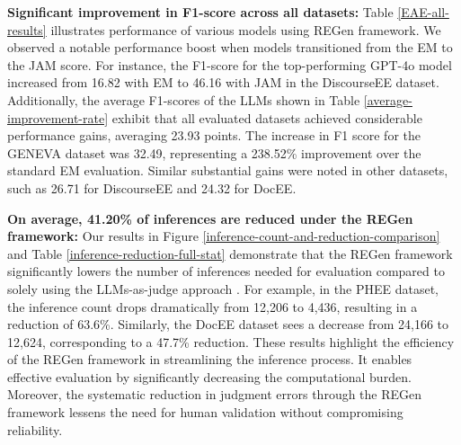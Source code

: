 \begin{table*}[h!]
\begin{tabular}{l|cccc|cccc|cccc}
\bottomrule
\end{tabular}

\caption{Evaluation results using the REGen framework for event argument extraction across the six datasets. The table reports F1-scores for models assessed at different evaluation levels: Exact Match (EM), Relaxed Match (RM), Complex Match (CM), and Judgment-Aligned Match (JAM). Due to space constraints, detailed precision, recall, and F1-scores are provided in Appendix Tables \ref{DiscourseEE-all-results}-\ref{WikiEvents-all-results}. The highest and the second-highest values in a column are highlighted using a dark shade and light shade, respectively.}
\label{EAE-all-results}
\end{table*}

\textbf{Significant improvement in F1-score across all datasets:} Table \ref{EAE-all-results} illustrates performance of various models using REGen framework. We observed a notable performance boost when models transitioned from the EM to the JAM score. For instance, the F1-score for the top-performing GPT-4o model increased from 16.82 with EM to 46.16 with JAM in the DiscourseEE dataset. Additionally, the average F1-scores of the LLMs shown in Table \ref{average-improvement-rate} exhibit that all evaluated datasets achieved considerable performance gains, averaging 23.93 points. The increase in F1 score for the GENEVA dataset was 32.49, representing a 238.52\% improvement over the standard EM evaluation. Similar substantial gains were noted in other datasets, such as 26.71 for DiscourseEE and 24.32 for DocEE. 


\textbf{On average, 41.20\% of inferences are reduced under the REGen framework:} Our results in Figure \ref{inference-count-and-reduction-comparison} and Table \ref{inference-reduction-full-stat} demonstrate that the REGen framework significantly lowers the number of inferences needed for evaluation compared to solely using the LLMs-as-judge approach \cite{lu2024exactmatchsemanticallyreassessing}. For example, in the PHEE dataset, the inference count drops dramatically from 12,206 to 4,436, resulting in a reduction of 63.6\%. Similarly, the DocEE dataset sees a decrease from 24,166 to 12,624, corresponding to a 47.7\% reduction. These results highlight the efficiency of the REGen framework in streamlining the inference process. It enables effective evaluation by significantly decreasing the computational burden. Moreover, the systematic reduction in judgment errors through the REGen framework lessens the need for human validation without compromising reliability.


